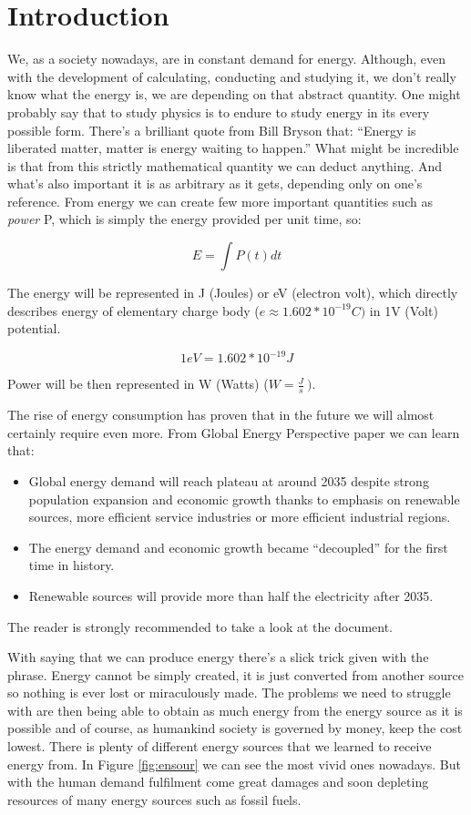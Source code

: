 \chapter{Introduction}
We, as a society nowadays, are in constant demand for energy. Although,
even with the development of calculating, conducting and studying it, we
don't really know what the energy is, we are depending on that abstract
quantity. One might probably say that to study physics is to endure to
study energy in its every possible form. There's a brilliant quote from
Bill Bryson that: ``Energy is liberated matter, matter is energy waiting
to happen.'' What might be incredible is that from this strictly
mathematical quantity we can deduct anything. And what's also important
it is as arbitrary as it gets, depending only on one's reference. From
energy we can create few more important quantities such as \emph{power}
P, which is simply the energy provided per unit time, so:

$$E = \int P\left( t \right)dt$$

\noindent The energy will be represented in J (Joules) or eV (electron
volt), which directly describes energy of elementary charge body
(\(e \approx 1.602*10^{- 19}C)\) in 1V (Volt) potential.

$$1eV = 1.602*10^{- 19}J$$

\noindent Power will be then represented in W (Watts) (\(W = \frac{J}{s}\ ).\)

\noindent The rise of energy consumption has proven that in the future we will
almost certainly require even more. From Global Energy Perspective paper 
\cite{Insights2019} we can learn that:

\begin{itemize}
\item Global energy demand will reach plateau at around 2035 despite strong population expansion and economic growth thanks to emphasis on renewable sources, more efficient service industries or more efficient industrial regions.
\item The energy demand and economic growth became ``decoupled'' for the first time in history.
\item Renewable sources will provide more than half the electricity after 2035.
\end{itemize}

\noindent The reader is strongly recommended to take a look at the document.

\noindent With saying that we can produce energy there's a slick trick given with
the phrase. Energy cannot be simply created, it is just converted from
another source so nothing is ever lost or miraculously made. The
problems we need to struggle with are then being able to obtain as much
energy from the energy source as it is possible and of course, as
humankind society is governed by money, keep the cost lowest. There is
plenty of different energy sources that we learned to receive energy
from. In Figure \ref{fig:ensour} we can see the most vivid ones nowadays. But with
the human demand fulfilment come great damages and soon depleting
resources of many energy sources such as fossil fuels.


